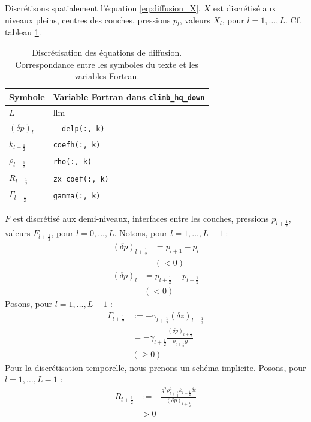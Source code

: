 \documentclass[a4paper,english,french]{article}
\begin{document}
Discrétisons spatialement l'équation \ref{eq:diffusion_X}. $X$ est
discrétisé aux niveaux pleins, centres des couches, pressions $p_l$,
valeurs $X_l$, pour $l = 1, \dots, L$. Cf. tableau \ref{tab:corresp}.
\begin{table}
  \centering
  \begin{tabular}{ll}
    Symbole & Variable Fortran dans \verb+climb_hq_down+ \\
    \hline
    $L$ & llm \\
    $(\delta p)_l$ & \verb+- delp(:, k)+ \\
    $k_{l - \frac{1}{2}}$ & \verb+coefh(:, k)+ \\
    $\rho_{l - \frac{1}{2}}$ & \verb+rho(:, k)+ \\
    $R_{l - \frac{1}{2}}$ & \verb+zx_coef(:, k)+ \\
    $\Gamma_{l - \frac{1}{2}}$ & \verb+gamma(:, k)+    
  \end{tabular}
  \caption[Discrétisation des équations de diffusion]{Discrétisation
    des équations de diffusion. Correspondance entre les symboles du
    texte et les variables Fortran.}
  \label{tab:corresp}
\end{table}
$F$ est discrétisé aux demi-niveaux, interfaces entre les couches, pressions
$p_{l + \frac{1}{2}}$, valeurs $F_{l + \frac{1}{2}}$, pour $l = 0,
\dots, L$. Notons, pour $l = 1, \dots, L - 1$ :
\begin{align*}
  (\delta p)_{l + \frac{1}{2}} & = p_{l + 1} - p_l \\
  & (< 0)
\end{align*}
\begin{align*}
  (\delta p)_l & = p_{l + \frac{1}{2}} - p_{l - \frac{1}{2}} \\
  & (< 0)
\end{align*}
Posons, pour $l = 1, \dots, L - 1$ :
\begin{align*}
  \Gamma_{l + \frac{1}{2}}
  & := - \gamma_{l + \frac{1}{2}} (\delta z)_{l + \frac{1}{2}} \\
  & = - \gamma_{l + \frac{1}{2}}
    \frac{(\delta p)_{l + \frac{1}{2}}}{\rho_{l + \frac{1}{2}} g} \\
  & (\ge 0)
\end{align*}
Pour la discrétisation temporelle, nous prenons un schéma
implicite. Posons, pour $l = 1, \dots, L - 1$ :
\begin{align*}
  R_{l + \frac{1}{2}}
  & := - \frac{g^2 \rho_{l + \frac{1}{2}}^2 k_{l + \frac{1}{2}} \delta t}
    {(\delta p)_{l + \frac{1}{2}}} \\
  & > 0
\end{align*}
\end{document}

